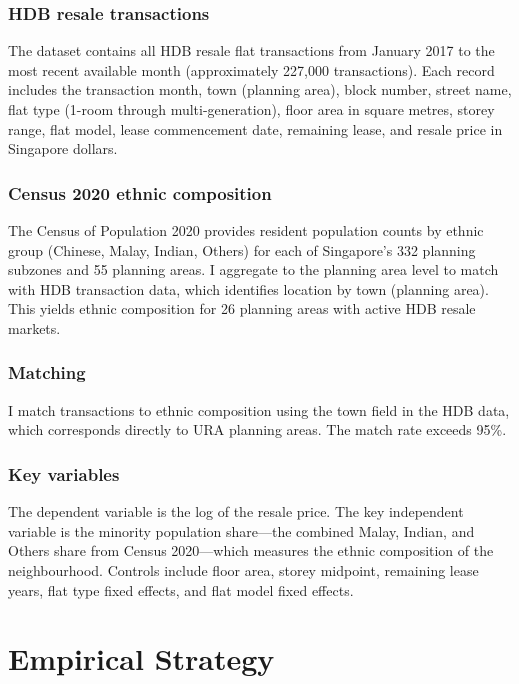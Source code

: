 \documentclass[12pt]{article}
\begin{document}
\subsubsection*{HDB resale transactions} The dataset contains all HDB resale flat transactions from January 2017 to the most recent available month (approximately 227,000 transactions). Each record includes the transaction month, town (planning area), block number, street name, flat type (1-room through multi-generation), floor area in square metres, storey range, flat model, lease commencement date, remaining lease, and resale price in Singapore dollars.

\subsubsection*{Census 2020 ethnic composition} The Census of Population 2020 provides resident population counts by ethnic group (Chinese, Malay, Indian, Others) for each of Singapore's 332 planning subzones and 55 planning areas. I aggregate to the planning area level to match with HDB transaction data, which identifies location by town (planning area). This yields ethnic composition for 26 planning areas with active HDB resale markets.

\subsubsection*{Matching} I match transactions to ethnic composition using the town field in the HDB data, which corresponds directly to URA planning areas. The match rate exceeds 95\%.

\subsubsection*{Key variables} The dependent variable is the log of the resale price. The key independent variable is the minority population share---the combined Malay, Indian, and Others share from Census 2020---which measures the ethnic composition of the neighbourhood. Controls include floor area, storey midpoint, remaining lease years, flat type fixed effects, and flat model fixed effects.




\section{Empirical Strategy}
\label{sec:strategy}
\end{document}
